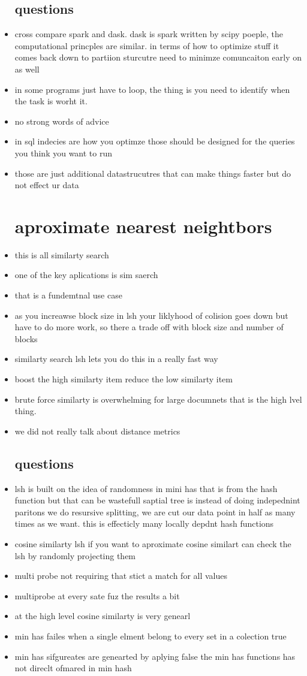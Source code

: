 \documentclass{article}
\begin{document}
\begin{itemize}
\subsection*{questions}
\item cross compare spark and dask. dask is spark written by scipy poeple, the computational princples are similar. in terms of how to optimize stuff it comes back down to partiion sturcutre need to minimze comuncaiton early on as well
\item in some programs just have to loop, the thing is you need to identify when the task is worht it. 
\item no strong words of advice 
\item in sql indecies are how you optimze those should be designed for the queries you think you want to run 
\item those are just additional datastrucutres that can make things faster but do not effect ur data 
\section*{aproximate nearest neightbors}
\item this is all similarty search
\item one of the key aplications is sim saerch 
\item that is a fundemtnal use case 
\item as you increawse block size in lsh your liklyhood of colision goes down but have to do more work, so there a trade off with block size and number of blocks 
\item similarty search lsh lets you do this in a really fast way
\item boost the high similarty item reduce the low similarty item 
\item brute force similarty is overwhelming for large documnets that is the high lvel thing. 
\item we did not really talk about distance metrics 
\subsection*{questions}
\item lsh is built on the idea of randomness in mini has that is from the hash function but that can be wastefull saptial tree is instead of doing indepednint paritons we do resursive splitting, we are cut our data point in half as many times as we want. this is effecticly many locally depdnt hash functions 
\item cosine similarty lsh if you want to aproximate cosine similart can check the lsh by randomly projecting them 
\item multi probe not requiring that stict a match for all values
\item multiprobe at every sate fuz the results a bit 
\item at the high level cosine similarty is very genearl
\item min has failes when a single elment belong to every set in a colection true 
\item min has sifgureates are genearted by aplying false the min has functions has not direclt ofmared in min hash

\end{itemize}
\end{document}
